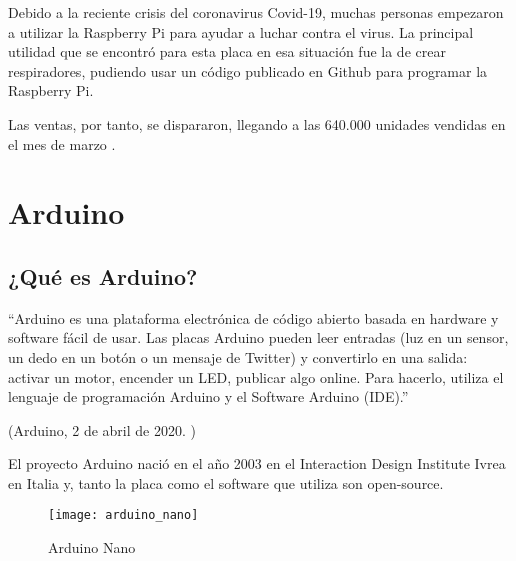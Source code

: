             Debido a la reciente crisis del coronavirus Covid-19, muchas personas empezaron a utilizar la Raspberry Pi
            para ayudar a luchar contra el virus. La principal utilidad que se encontró para esta placa en esa situación
            fue la de crear respiradores, pudiendo usar un código publicado en Github \cite{github_respirador} para
            programar la Raspberry Pi.

            Las ventas, por tanto, se dispararon, llegando a las 640.000 unidades vendidas en el mes de
            marzo \cite{ventas_raspberry_pi_covid}.



    \section{Arduino} %
    \label{sec:Arduino}

        \subsection{¿Qué es Arduino?} %
        \label{sub:QueEsArduino}

            ``Arduino es una plataforma electrónica de código abierto basada en hardware y software fácil de usar. Las
            placas Arduino pueden leer entradas (luz en un sensor, un dedo en un botón o un mensaje de Twitter) y
            convertirlo en una salida: activar un motor, encender un LED, publicar algo online. Para hacerlo, utiliza
            el lenguaje de programación Arduino y el Software Arduino (IDE).''

            \begin{flushright}
                (Arduino, 2 de abril de 2020. \cite{arduino_introduction})
            \end{flushright}

            El proyecto Arduino nació en el año 2003 en el Interaction Design Institute Ivrea en Italia y, tanto la
            placa como el software que utiliza son open-source.

            \begin{figure}[ht]
                \centering
                \texttt{[image: arduino\_nano]}
                \caption{Arduino Nano \cite{imagen_arduino_nano}\label{fig:ImagenArduinoNano}}
            \end{figure}


